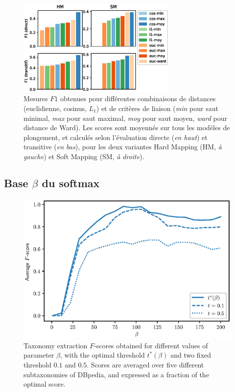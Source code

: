 \begin{figure}[h]
    \centering
    \includegraphics[width=0.7\textwidth]{fig/plot/taxex_cluparams-all.eps}
    \caption{Mesures $F1$ obtenues pour différentes combinaisons de distances (euclidienne, cosinus, $L_1$) et de critères de liaison (\textit{min} pour saut minimal, \textit{max} pour saut maximal, \textit{moy} pour saut moyen, \textit{ward} pour distance de Ward). Les scores sont moyennés sur tous les modèles de plongement, et calculés selon l'évaluation directe (\textit{en haut}) et transitive (\textit{en bas}), pour les deux variantes Hard Mapping (HM, \textit{à gauche}) et Soft Mapping (SM, \textit{à droite}).}
    \label{fig:taxex-cluparams-all}
\end{figure}

\subsection{Base \texorpdfstring{$\beta$}{beta} du softmax}
\label{subsec:te-hp-beta}

\begin{figure}
    \centering
    \includegraphics{fig/plot/average_beta_vs_best.eps}
    \caption{Taxonomy extraction $F$-scores obtained for different values of parameter $\beta$, with the optimal threshold $t^*(\beta)$ and two fixed threshold $0.1$ and $0.5$. Scores are averaged over five different subtaxonomies of DBpedia, and expressed as a fraction of the optimal score.}
    \label{fig:beta-search-1}
\end{figure}

